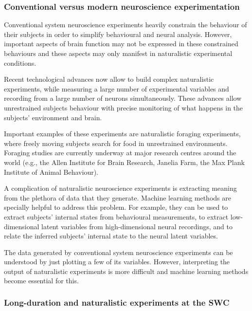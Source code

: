\subsubsection*{Conventional versus modern neuroscience experimentation}

Conventional system neuroscience experiments heavily constrain the behaviour of
their subjects in order to simplify behavioural and neural analysis.  However,
important aspects of brain function may not be expressed in these constrained
behaviours and these aspects may only manifest in naturalistic experimental
conditions.


Recent technological advances now allow to build complex naturalistic
experiments, while measuring a large number of experimental variables and
recording from a large number of neurons simultaneously. These advances
allow unrestrained subjects behaviour with precise monitoring of what happens in
the subjects' environment and brain.

Important examples of these experiments are naturalistic foraging experiments,
where freely moving subjects search for food in unrestrained environments.
Foraging studies are currently underway at major research centres around the
world (e.g., the Allen Institute for Brain Research, Janelia Farm, the Max
Plank Institute of Animal Behaviour).

A complication of naturalistic neuroscience experiments is extracting meaning
from the plethora of data that they generate. Machine learning methods are
specially helpful to address this problem. For example, they can be used to
extract subjects' internal states from behavioural measurements, to extract
low-dimensional latent variables from high-dimensional neural recordings, and
to relate the inferred subjects' internal state to the neural latent variables.

The data generated by conventional system neuroscience experiments can be
understood by just plotting a few of its variables. However, interpreting the output
of naturalistic experiments is more difficult and machine learning methods
become essential for this.

\subsubsection*{Long-duration and naturalistic experiments at the SWC}

